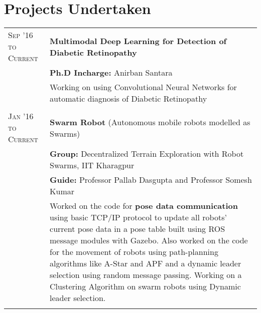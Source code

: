 \documentclass[a4paper,11pt]{extarticle} %
\begin{document}
\section{Projects Undertaken}

\begin{tabular}{R{3.5cm}|p{14.5cm}}
\textsc{Sep '16 to Current} & \textbf{Multimodal Deep Learning for Detection of Diabetic Retinopathy} \\
 & \textbf{Ph.D Incharge: }\textmd{Anirban Santara}\\
 
 & \textmd{ Working on using Convolutional Neural Networks for automatic diagnosis of Diabetic Retinopathy}\\
 \\

\textsc{Jan '16 to Current} & \textbf{Swarm Robot} \textmd{(Autonomous mobile robots modelled as Swarms)} \\
 & \textbf{Group: }\textmd{Decentralized Terrain Exploration with Robot Swarms}, IIT Kharagpur\\
& \textbf{Guide: }\textmd{Professor Pallab Dasgupta} and \textmd{Professor Somesh Kumar}\\
& \textmd{Worked on the code for \textbf{pose data communication} using basic TCP/IP protocol to update all robots' current pose data in a pose table built using ROS message modules with Gazebo. Also worked on the code for the movement of robots using path-planning algorithms like A-Star and APF and a dynamic leader selection using random message passing. Working on a Clustering Algorithm on swarm robots using Dynamic leader selection.}\\
 \\





\end{tabular}
\end{document}
